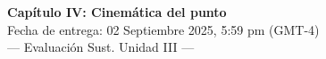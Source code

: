  \begin{multicols}{2}
     \begin{center}
         \LARGE{\textbf{Capítulo IV: Cinemática del punto}}\\	
         \vspace{0.2cm}
         \large{Fecha de entrega: 02 Septiembre 2025, 5:59 pm (GMT-4)}\\
         \large{— Evaluación Sust. Unidad III —}
     \end{center}
    


\end{multicols}
